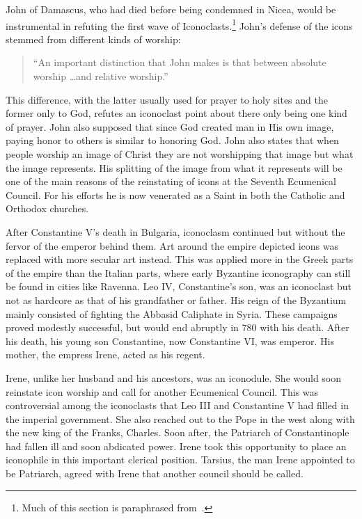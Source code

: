 \documentclass[12pt]{article}
\begin{document}
    John of Damascus, who had died before being condemned in Nicea, would be instrumental in refuting the first wave of Iconoclasts.\footnote{Much of this section is paraphrased from~\cite{JohnDam}.} John's defense of the icons stemmed from different kinds of worship: \begin{quote}
        ``An important distinction that John makes is that between absolute worship \dots and relative worship.''~\cite[p.457]{JohnDam}
    \end{quote}\noindent
    This difference, with the latter usually used for prayer to holy sites and the former only to God, refutes an iconoclast point about there only being one kind of prayer. John also supposed that since God created man in His own image, paying honor to others is similar to honoring God. John also states that when people worship an image of Christ they are not worshipping that image but what the image represents. His splitting of the image from what it represents will be one of the main reasons of the reinstating of icons at the Seventh Ecumenical Council. For his efforts he is now venerated as a Saint in both the Catholic and Orthodox churches. \

    After Constantine V's death in Bulgaria, iconoclasm continued but without the fervor of the emperor behind them. Art around the empire depicted icons was replaced with more secular art instead. This was applied more in the Greek parts of the empire than the Italian parts, where early Byzantine iconography can still be found in cities like Ravenna. Leo IV, Constantine's son, was an iconoclast but not as hardcore as that of his grandfather or father. His reign of the Byzantium mainly consisted of fighting the Abbasid Caliphate in Syria. These campaigns proved modestly successful, but would end abruptly in 780 with his death. After his death, his young son Constantine, now Constantine VI, was emperor. His mother, the empress Irene, acted as his regent. \

    Irene, unlike her husband and his ancestors, was an iconodule. She would soon reinstate icon worship and call for another Ecumenical Council. This was controversial among the iconoclasts that Leo III and Constantine V had filled in the imperial government. She also reached out to the Pope in the west along with the new king of the Franks, Charles. Soon after, the Patriarch of Constantinople had fallen ill and soon abdicated power. Irene took this opportunity to place an iconophile in this important clerical position. Tarsius, the man Irene appointed to be Patriarch, agreed with Irene that another council should be called. \
    
\end{document}
